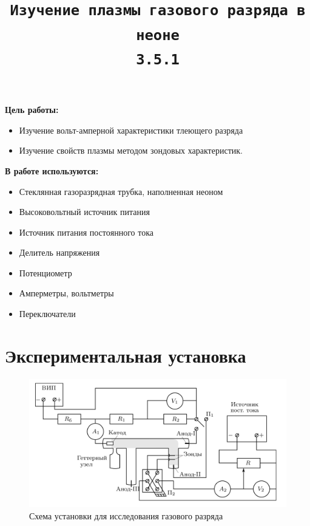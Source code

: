 \documentclass[12pt,a4paper]{article}
\title{\texttt{Изучение плазмы газового разряда в неоне \\ 3.5.1}}
\author{}
\date{}
\begin{document}
\maketitle

\textbf{Цель работы:}

\begin{itemize}
  \item  Изучение вольт-амперной характеристики тлеющего раз­ряда
  \item Изучение свойств плазмы методом зондовых характеристик.
\end{itemize}

\textbf{В работе используются:}  
\begin{itemize}
  \item Стеклянная газоразрядная трубка, наполнен­ная неоном
  \item Высоковольтный источник питания
  \item Источник питания посто­янного тока
  \item Делитель напряжения
  \item Потенциометр
  \item Амперметры, вольтметры
  \item Переключатели
\end{itemize}

\section*{Экспериментальная установка}

\begin{figure}[H]
  \includegraphics*[width=\textwidth]{2023-09-02-00-10-53.png}
  \caption{Схема установки для исследования газового разряда}
  \label{fig:ust}
\end{figure}
\end{document}
